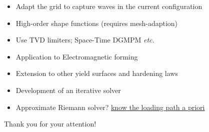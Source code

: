 \documentclass[11pt,aspectratio=1610]{beamer}
\begin{document}
\begin{frame}[standout]{}
  \begin{footnotesize}
    \begin{block}{}
      \begin{itemize}
      \item[] Adapt the grid to capture waves in the current configuration
      \item[] High-order shape functions (requires mesh-adaption)
      \item[] Use TVD limiters; Space-Time DGMPM \textit{etc.}
      \item[] Application to Electromagnetic forming
      \end{itemize}
    \end{block}

    
    \begin{block}{}
      \begin{itemize}
      \item[] Extension to other yield surfaces and hardening laws
      \item[] Development of an iterative solver
      \item[] Approximate Riemann solver? \underline{know the loading path a priori}
      \end{itemize}
    \end{block}
  \end{footnotesize}

\end{frame}

\begin{frame}[standout]{}
  Thank you for your attention!
\end{frame}

\appendix


\end{document}
